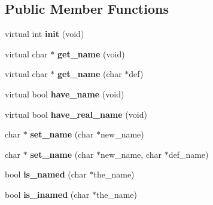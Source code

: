 \subsection*{Public Member Functions}
\begin{DoxyCompactItemize}
\item 
\hypertarget{classcl__base_a3804b6d8f2ce3a5e5b040a0346c5df12}{
virtual int {\bfseries init} (void)}
\label{classcl__base_a3804b6d8f2ce3a5e5b040a0346c5df12}

\item 
\hypertarget{classcl__base_a42251e19372c87758751e7793435b5b9}{
virtual char $\ast$ {\bfseries get\_\-name} (void)}
\label{classcl__base_a42251e19372c87758751e7793435b5b9}

\item 
\hypertarget{classcl__base_ac28e9c4747af317608f3a3d9ced2c73e}{
virtual char $\ast$ {\bfseries get\_\-name} (char $\ast$def)}
\label{classcl__base_ac28e9c4747af317608f3a3d9ced2c73e}

\item 
\hypertarget{classcl__base_aec39c1134181cfb60560c6ac83cedd6f}{
virtual bool {\bfseries have\_\-name} (void)}
\label{classcl__base_aec39c1134181cfb60560c6ac83cedd6f}

\item 
\hypertarget{classcl__base_af2a6ef67766f771763287e8db8abc559}{
virtual bool {\bfseries have\_\-real\_\-name} (void)}
\label{classcl__base_af2a6ef67766f771763287e8db8abc559}

\item 
\hypertarget{classcl__base_aab1d4c35918cc5fbd716580866a86094}{
char $\ast$ {\bfseries set\_\-name} (char $\ast$new\_\-name)}
\label{classcl__base_aab1d4c35918cc5fbd716580866a86094}

\item 
\hypertarget{classcl__base_a80c98cfa1463a93e2b587840e00a1d22}{
char $\ast$ {\bfseries set\_\-name} (char $\ast$new\_\-name, char $\ast$def\_\-name)}
\label{classcl__base_a80c98cfa1463a93e2b587840e00a1d22}

\item 
\hypertarget{classcl__base_a0369f79f3218534fd46ebeb82e0c7b87}{
bool {\bfseries is\_\-named} (char $\ast$the\_\-name)}
\label{classcl__base_a0369f79f3218534fd46ebeb82e0c7b87}

\item 
\hypertarget{classcl__base_af5cdd39f8c4e0e456a9f02f6f9244bac}{
bool {\bfseries is\_\-inamed} (char $\ast$the\_\-name)}
\label{classcl__base_af5cdd39f8c4e0e456a9f02f6f9244bac}


\end{DoxyCompactItemize}
